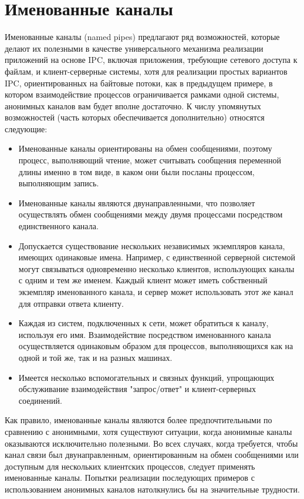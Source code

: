 \documentclass[a4paper,12pt]{article} %
\begin{document}
\section*{Именованные каналы}

Именованные каналы (named pipes) предлагают ряд возможностей, которые делают их полезными в качестве универсального механизма реализации приложений на основе IPC, включая приложения, требующие сетевого доступа к файлам, и клиент-серверные системы, хотя для реализации простых вариантов IPC, ориентированных на байтовые потоки, как в предыдущем примере, в котором взаимодействие процессов ограничивается рамками одной системы, анонимных каналов вам будет вполне достаточно. К числу упомянутых возможностей (часть которых обеспечивается дополнительно) относятся следующие:

\begin{itemize}
\item Именованные каналы ориентированы на обмен сообщениями, поэтому процесс, выполняющий чтение, может считывать сообщения переменной длины именно в том виде, в каком они были посланы процессом, выполняющим запись.

\item Именованные каналы являются двунаправленными, что позволяет осуществлять обмен сообщениями между двумя процессами посредством единственного канала.

\item Допускается существование нескольких независимых экземпляров канала, имеющих одинаковые имена. Например, с единственной серверной системой могут связываться одновременно несколько клиентов, использующих каналы с одним и тем же именем. Каждый клиент может иметь собственный экземпляр именованного канала, и сервер может использовать этот же канал для отправки ответа клиенту.

\item Каждая из систем, подключенных к сети, может обратиться к каналу, используя его имя. Взаимодействие посредством именованного канала осуществляется одинаковым образом для процессов, выполняющихся как на одной и той же, так и на разных машинах.

\item Имеется несколько вспомогательных и связных функций, упрощающих обслуживание взаимодействия "запрос/ответ" и клиент-серверных соединений.
\end{itemize}

Как правило, именованные каналы являются более предпочтительными по сравнению с анонимными, хотя существуют ситуации, когда анонимные каналы оказываются исключительно полезными. Во всех случаях, когда требуется, чтобы канал связи был двунаправленным, ориентированным на обмен сообщениями или доступным для нескольких клиентских процессов, следует применять именованные каналы. Попытки реализации последующих примеров с использованием анонимных каналов натолкнулись бы на значительные трудности.
\end{document}
